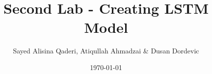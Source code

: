\documentclass[
    numbers=noenddot,
    parskip=half-,
    fontsize=12pt,
    paper=a4,
    oneside,
    titlepage,
    bibliography=totoc,
    chapterprefix=false,
]{scrbook}
\title{Second Lab - Creating LSTM Model}
\author{Sayed Alisina Qaderi, Atiqullah Ahmadzai \& Dusan Dordevic}
\date{\today}
\begin{document}
\frontmatter
%


\tableofcontents
\newpage

% 

% 

\thispagestyle{empty}
\cleardoublepage
\listoffigures
\newpage


\mainmatter






\begin{appendices}
    
\end{appendices}
\newpage


\backmatter

\printbibliography

% 
\end{document}
